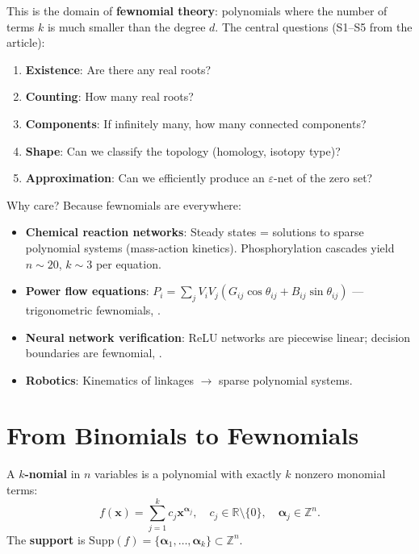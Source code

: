 This is the domain of \textbf{fewnomial theory}: polynomials where the number of terms $k$ is much smaller than the degree $d$. The central questions (S1--S5 from the article): \cite{rojas2025fewnomial}
\begin{enumerate}
    \item \textbf{Existence}: Are there any real roots?
    \item \textbf{Counting}: How many real roots?
    \item \textbf{Components}: If infinitely many, how many connected components?
    \item \textbf{Shape}: Can we classify the topology (homology, isotopy type)?
    \item \textbf{Approximation}: Can we efficiently produce an $\varepsilon$-net of the zero set?
\end{enumerate}

Why care? Because fewnomials are everywhere: \cite{rojas2025fewnomial}
\begin{itemize}
    \item \textbf{Chemical reaction networks}: Steady states = solutions to sparse polynomial systems (mass-action kinetics). Phosphorylation cascades yield $n \sim 20$, $k \sim 3$ per equation.
    \item \textbf{Power flow equations}: $P_i = \sum_j V_i V_j (G_{ij}\cos\theta_{ij} + B_{ij}\sin\theta_{ij})$ --- trigonometric fewnomials, \cite{rojas2025fewnomial}.
    \item \textbf{Neural network verification}: ReLU networks are piecewise linear; decision boundaries are fewnomial, \cite{rojas2025fewnomial}.
    \item \textbf{Robotics}: Kinematics of linkages $\rightarrow$ sparse polynomial systems.
\end{itemize}

\section{From Binomials to Fewnomials}
\label{sec:few:binomials}

\begin{definition}[$k$-nomial]
A \textbf{$k$-nomial} in $n$ variables is a polynomial with exactly $k$ nonzero monomial terms:
\[
f(\bm{x}) = \sum_{j=1}^k c_j \bm{x}^{\bm{\alpha}_j}, \quad c_j \in \mathbb{R}\setminus\{0\}, \quad \bm{\alpha}_j \in \mathbb{Z}^n.
\]
The \textbf{support} is $\mathrm{Supp}(f) = \{\bm{\alpha}_1,\dots,\bm{\alpha}_k\} \subset \mathbb{Z}^n$.
\end{definition}


